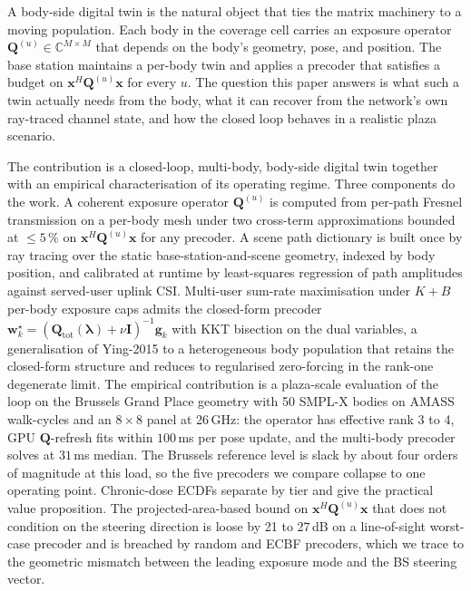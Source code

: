 \documentclass[journal,twocolumn,10pt]{IEEEtran}
\theoremstyle{plain}
\theoremstyle{remark}
\newcommand{\xx}{\mathbf{x}}
\newcommand{\ww}{\mathbf{w}}
\newcommand{\gvec}{\mathbf{g}}
\newcommand{\Qmat}{\mathbf{Q}}
\newcommand{\Complex}{\mathbb{C}}
\begin{document}
A body-side digital twin is the natural object that ties the matrix
machinery to a moving population. Each body in the coverage cell
carries an exposure operator $\Qmat^{(u)} \in \Complex^{M \times M}$
that depends on the body's geometry, pose, and position. The base
station maintains a per-body twin and applies a precoder that
satisfies a budget on $\xx^H \Qmat^{(u)} \xx$ for every $u$. The
question this paper answers is what such a twin actually needs from
the body, what it can recover from the network's own ray-traced
channel state, and how the closed loop behaves in a realistic plaza
scenario.

The contribution is a closed-loop, multi-body, body-side digital twin
together with an empirical characterisation of its operating regime.
Three components do the work. A coherent exposure operator $\Qmat^{(u)}$
is computed from per-path Fresnel transmission on a per-body mesh
under two cross-term approximations bounded at $\leq 5\,\%$ on
$\xx^H \Qmat^{(u)} \xx$ for any precoder. A scene path dictionary is
built once by ray tracing over the static base-station-and-scene
geometry, indexed by body position, and calibrated at runtime by
least-squares regression of path amplitudes against served-user
uplink CSI. Multi-user sum-rate maximisation under $K + B$ per-body
exposure caps admits the closed-form precoder
$\ww_k^\star = (\Qmat_{\mathrm{tot}}(\bm\lambda) + \nu \mathbf{I})^{-1}
\gvec_k$ with KKT bisection on the dual variables, a generalisation of
Ying-2015 to a heterogeneous body population that retains the
closed-form structure and reduces to regularised zero-forcing in the
rank-one degenerate limit. The empirical contribution is a
plaza-scale evaluation of the loop on the Brussels Grand Place
geometry with 50 SMPL-X bodies on AMASS walk-cycles and an
$8 \times 8$ panel at 26\,GHz: the operator has effective rank 3 to 4,
GPU $\Qmat$-refresh fits within $100\,$ms per pose update, and the
multi-body precoder solves at $31\,$ms median. The Brussels reference
level is slack by about four orders of magnitude at this load, so the
five precoders we compare collapse to one operating point. Chronic-dose
ECDFs separate by tier and give the practical value proposition. The
projected-area-based bound on $\xx^H \Qmat^{(u)} \xx$ that does not
condition on the steering direction is loose by 21 to 27\,dB on a
line-of-sight worst-case precoder and is breached by random and ECBF
precoders, which we trace to the geometric mismatch between the
leading exposure mode and the BS steering vector.
\end{document}
